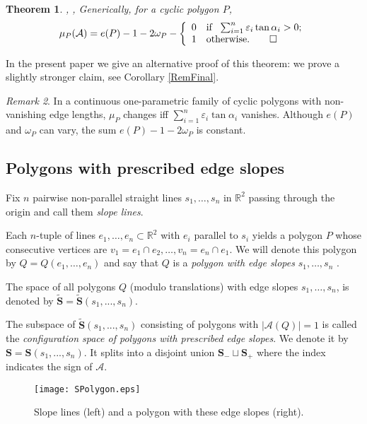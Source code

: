 \documentclass[12pt]{amsart}
\theoremstyle{plain}
\newtheorem{theorem}{Theorem}
\theoremstyle{definition}
\theoremstyle{remark}
\newtheorem{remark}[theorem]{Remark}
\theoremstyle{plain}
\theoremstyle{definition}
\def\R{\mathbb{R}}
\begin{document}
\begin{theorem}\label{Thm_Morse_closed_plane}\cite{khipan1}, \cite{panzh}, \cite{zhu} Generically,
for a cyclic polygon $P$,
$$\mu_P( \mathcal{A})= e(P)-1-2\omega_P-\left\{
       \begin{array}{ll}
    0    &\hbox{if }\   \sum_{i=1}^n \varepsilon_i \tan \alpha_i>0; \\
        1 & \hbox{otherwise}.\qed
       \end{array}
     \right.$$
\end{theorem}

In the present paper we give an alternative proof of this theorem: we prove a slightly stronger claim, see Corollary \ref{RemFinal}.
\begin{remark}
 In a continuous one-parametric family of  cyclic polygons  with non-vanishing edge lengths, $\mu_P$ changes iff  $\sum_{i=1}^n \varepsilon_i \tan \alpha_i$  vanishes. Although $e(P)$ and $\omega_P$  can vary, the sum $e(P)-1-2\omega_P$ is constant.
\end{remark}
\bigskip


\subsection{Polygons with prescribed edge slopes}

Fix $n$ pairwise non-parallel straight lines  \(s_1,\ldots,s_n\) in \(\R^2\) passing through the origin and call them \textit{slope lines}.

Each \(n\)-tuple of  lines \(e_1,\ldots,e_n\subset \R^2\)
 with  $e_i$ parallel to $s_i$ yields a polygon $P$ whose consecutive vertices  are \(v_1=e_1\cap e_2, \ldots, v_n=e_n\cap e_1 \). We will denote this polygon by \(Q=Q\left(e_1,\ldots,e_n\right)\)  and say that $Q$ is a \textit{polygon with edge slopes} \(s_1,\ldots,s_n\) .

The space of all  polygons $Q$ (modulo translations)
 with edge slopes \(s_1,\ldots,s_n\),
  is denoted  by $\widetilde{\mathbf{S}}=\widetilde{\mathbf{S}}(s_1,...,s_n)$.


The subspace of $\widetilde{\mathbf{S}}(s_1,...,s_n)$ consisting of polygons with $|\mathcal{A}(Q)|=1$
is called the    \textit{configuration space
of polygons  with prescribed edge slopes}. We denote it by $\mathbf{S}=\mathbf{S}(s_1,...,s_n)$. It splits into a disjoint union \(\mathbf{S}_-\sqcup \mathbf{S}_+\) where the index indicates the sign of \(\mathcal{A}\).

\begin{figure}[h]
\centering \texttt{[image: SPolygon.eps]}
\caption{Slope lines (left)  and  a polygon with these edge slopes (right).}\label{FigSlopes}
\end{figure}
\end{document}
